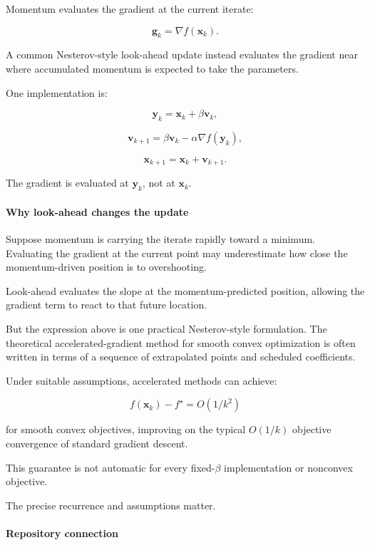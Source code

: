 Momentum evaluates the gradient at the current iterate:

\[
\mathbf g_k=\nabla f(\mathbf x_k).
\]

A common Nesterov-style look-ahead update instead evaluates the gradient near where accumulated momentum is expected to take the parameters.

One implementation is:

\[
\mathbf y_k=\mathbf x_k+\beta\mathbf v_k,
\]

\[
\mathbf v_{k+1} = \beta\mathbf v_k-\alpha\nabla f(\mathbf y_k),
\]

\[
\mathbf x_{k+1}=\mathbf x_k+\mathbf v_{k+1}.
\]

The gradient is evaluated at \(\mathbf y_k\), not at \(\mathbf x_k\).

\paragraph{Why look-ahead changes the update}\label{02-foundations-ii-ch026-why-look-ahead-changes-the-update}

\hypertarget{02-foundations-ii-ch026-why-look-ahead-changes-the-update}{}

Suppose momentum is carrying the iterate rapidly toward a minimum. Evaluating the gradient at the current point may underestimate how close the momentum-driven position is to overshooting.

Look-ahead evaluates the slope at the momentum-predicted position, allowing the gradient term to react to that future location.

But the expression above is one practical Nesterov-style formulation. The theoretical accelerated-gradient method for smooth convex optimization is often written in terms of a sequence of extrapolated points and scheduled coefficients.

Under suitable assumptions, accelerated methods can achieve:

\[
f(\mathbf x_k)-f^\star=O(1/k^2)
\]

for smooth convex objectives, improving on the typical \(O(1/k)\) objective convergence of standard gradient descent.

This guarantee is not automatic for every fixed-\(\beta\) implementation or nonconvex objective.

The precise recurrence and assumptions matter.

\paragraph{Repository connection}\label{02-foundations-ii-ch026-repository-connection}

